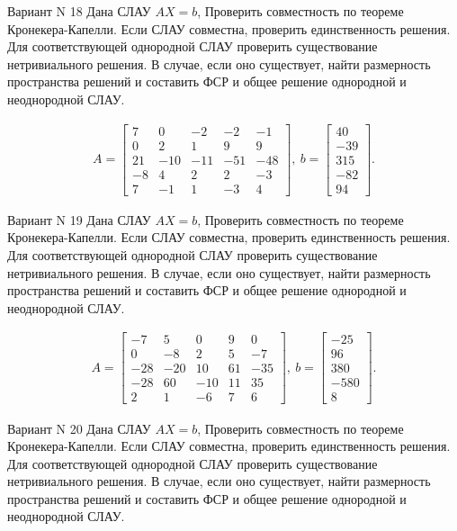 \documentclass[11pt]{report}
\begin{document}
Вариант N 18
Дана СЛАУ $AX = b$,
Проверить совместность по теореме Кронекера-Капелли. Если СЛАУ совместна, проверить единственность решения.
Для соответствующей однородной СЛАУ проверить существование нетривиального решения. В случае, если оно существует,
найти размерность пространства решений и составить ФСР и общее решение однородной  и неоднородной СЛАУ.


\begin{align*}
 A = \left[\begin{matrix}7 & 0 & -2 & -2 & -1\\0 & 2 & 1 & 9 & 9\\21 & -10 & -11 & -51 & -48\\-8 & 4 & 2 & 2 & -3\\7 & -1 & 1 & -3 & 4\end{matrix}\right],
\ b = \left[\begin{matrix}40\\-39\\315\\-82\\94\end{matrix}\right]. 
 \end{align*}

Вариант N 19
Дана СЛАУ $AX = b$,
Проверить совместность по теореме Кронекера-Капелли. Если СЛАУ совместна, проверить единственность решения.
Для соответствующей однородной СЛАУ проверить существование нетривиального решения. В случае, если оно существует,
найти размерность пространства решений и составить ФСР и общее решение однородной  и неоднородной СЛАУ.


\begin{align*}
 A = \left[\begin{matrix}-7 & 5 & 0 & 9 & 0\\0 & -8 & 2 & 5 & -7\\-28 & -20 & 10 & 61 & -35\\-28 & 60 & -10 & 11 & 35\\2 & 1 & -6 & 7 & 6\end{matrix}\right],
\ b = \left[\begin{matrix}-25\\96\\380\\-580\\8\end{matrix}\right]. 
 \end{align*}

Вариант N 20
Дана СЛАУ $AX = b$,
Проверить совместность по теореме Кронекера-Капелли. Если СЛАУ совместна, проверить единственность решения.
Для соответствующей однородной СЛАУ проверить существование нетривиального решения. В случае, если оно существует,
найти размерность пространства решений и составить ФСР и общее решение однородной  и неоднородной СЛАУ.
\end{document}
